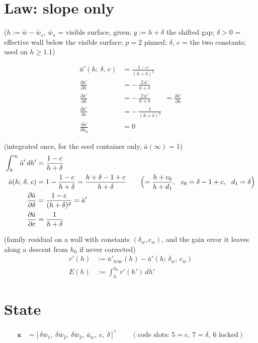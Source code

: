 \documentclass[11pt,a4paper,fontset=none]{ctexart}
\newcommand{\ba}{\bar{a}}
\newcommand{\bw}{\bar{w}}
\newcommand{\ap}{\ba'}
\newcommand{\dl}{\delta}
\newcommand{\gs}{g}
\begin{document}
\section{Law: slope only}

($h := \bw - \bw_s$, $\bw_s$ = visible surface, given; $\gs := h + \dl$ the shifted gap; $\dl > 0$ = effective wall below the visible surface;
$p = 2$ pinned; $\dl$, $c$ = the two constants; used on $h \ge 1.1$)

\begin{align*}
\ap(h;\,\dl,\,c)                        &= \frac{1 - c}{(h + \dl)^{2}} \\[2pt]
\frac{\partial\ap}{\partial h}          &= -\,\frac{2\,\ap}{h + \dl} \\[2pt]
\frac{\partial\ap}{\partial\dl}         &= -\,\frac{2\,\ap}{h + \dl} \qquad = \frac{\partial\ap}{\partial h} \\[2pt]
\frac{\partial\ap}{\partial c}          &= -\,\frac{1}{(h + \dl)^{2}} \\[2pt]
\frac{\partial\ap}{\partial\ba_w}       &= 0
\end{align*}

(integrated once, for the seed container only, $\ba(\infty) = 1$)
\begin{align*}
\int_{h}^{\infty}\ap\,dh'               &= \frac{1 - c}{h + \dl} \\
\ba(h;\,\dl,\,c)                        &= 1 - \frac{1 - c}{h + \dl} = \frac{h + \dl - 1 + c}{h + \dl}
                                           \qquad\Bigl(= \frac{h + c_0}{h + d_1},\ \ c_0 = \dl - 1 + c,\ \ d_1 = \dl\Bigr) \\
\frac{\partial\ba}{\partial\dl}         &= \frac{1 - c}{(h + \dl)^{2}} = \ap \\
\frac{\partial\ba}{\partial c}          &= \frac{1}{h + \dl}
\end{align*}

(family residual on a wall with constants $(\dl_w, c_w)$, and the gain error it leaves along a descent from $h_0$ if never corrected)
\begin{align*}
r'(h)   &:= \ap_{\mathrm{true}}(h) - \ap(h;\,\dl_w,\,c_w) \\
E(h)    &:= \int_{h}^{h_0} r'(h')\,dh'
\end{align*}

\section{State}

\begin{align*}
\mathbf{x} &= \bigl[\,\delta\bw_1,\ \delta\bw_2,\ \delta\bw_3,\ \ba_w,\ c,\ \dl\,\bigr]^{\top}
\qquad(\text{code slots: } 5 = c,\ 7 = \dl,\ 6 \text{ locked})
\end{align*}
\end{document}
